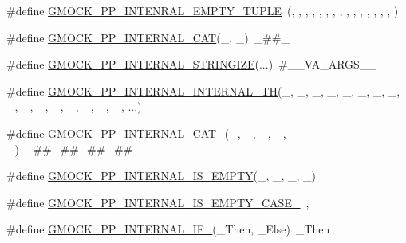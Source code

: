 \begin{DoxyCompactItemize}
\item 
\#define \mbox{\hyperlink{googletest-master_2googlemock_2include_2gmock_2internal_2gmock-pp_8h_a7a4a2a8606d20424b0ec1db4236819e4}{G\+M\+O\+C\+K\+\_\+\+P\+P\+\_\+\+I\+N\+T\+E\+N\+R\+A\+L\+\_\+\+E\+M\+P\+T\+Y\+\_\+\+T\+U\+P\+LE}}~(, , , , , , , , , , , , , , , )
\item 
\#define \mbox{\hyperlink{googletest-master_2googlemock_2include_2gmock_2internal_2gmock-pp_8h_a2b034c776c832e3d951f5d123658a7ba}{G\+M\+O\+C\+K\+\_\+\+P\+P\+\_\+\+I\+N\+T\+E\+R\+N\+A\+L\+\_\+\+C\+AT}}(\+\_,  \+\_)~\+\_\#\#\+\_
\item 
\#define \mbox{\hyperlink{googletest-master_2googlemock_2include_2gmock_2internal_2gmock-pp_8h_afd092b75707cbc1efd7fe183c94afb79}{G\+M\+O\+C\+K\+\_\+\+P\+P\+\_\+\+I\+N\+T\+E\+R\+N\+A\+L\+\_\+\+S\+T\+R\+I\+N\+G\+I\+ZE}}(...)~\#\+\_\+\+\_\+\+V\+A\+\_\+\+A\+R\+G\+S\+\_\+\+\_\+
\item 
\#define \mbox{\hyperlink{googletest-master_2googlemock_2include_2gmock_2internal_2gmock-pp_8h_ac3815de01d162a72578830f0ffbfbeb3}{G\+M\+O\+C\+K\+\_\+\+P\+P\+\_\+\+I\+N\+T\+E\+R\+N\+A\+L\+\_\+\+I\+N\+T\+E\+R\+N\+A\+L\+\_\+TH}}(\+\_,  \+\_,  \+\_,  \+\_,  \+\_,  \+\_,  \+\_,  \+\_,  \+\_,  \+\_,  \+\_,  \+\_,  \+\_,  \+\_,  \+\_,  \+\_,  ...)~\+\_
\item 
\#define \mbox{\hyperlink{googletest-master_2googlemock_2include_2gmock_2internal_2gmock-pp_8h_a11241887f4be09cdb6a57bb841620581}{G\+M\+O\+C\+K\+\_\+\+P\+P\+\_\+\+I\+N\+T\+E\+R\+N\+A\+L\+\_\+\+C\+A\+T\+\_}}(\+\_,  \+\_,  \+\_,  \+\_,  \+\_)~\+\_\#\#\+\_\#\#\+\_\#\#\+\_\#\#\+\_
\item 
\#define \mbox{\hyperlink{googletest-master_2googlemock_2include_2gmock_2internal_2gmock-pp_8h_a7ed13884d5ca70a35102f76d65677b13}{G\+M\+O\+C\+K\+\_\+\+P\+P\+\_\+\+I\+N\+T\+E\+R\+N\+A\+L\+\_\+\+I\+S\+\_\+\+E\+M\+P\+TY}}(\+\_,  \+\_,  \+\_,  \+\_)
\item 
\#define \mbox{\hyperlink{googletest-master_2googlemock_2include_2gmock_2internal_2gmock-pp_8h_ad02fd031aeb323ae431ebdfda4acdc99}{G\+M\+O\+C\+K\+\_\+\+P\+P\+\_\+\+I\+N\+T\+E\+R\+N\+A\+L\+\_\+\+I\+S\+\_\+\+E\+M\+P\+T\+Y\+\_\+\+C\+A\+S\+E\+\_}}~,
\item 
\#define \mbox{\hyperlink{googletest-master_2googlemock_2include_2gmock_2internal_2gmock-pp_8h_a9983cbccb2cbb6892e983b28ac9e2077}{G\+M\+O\+C\+K\+\_\+\+P\+P\+\_\+\+I\+N\+T\+E\+R\+N\+A\+L\+\_\+\+I\+F\+\_}}(\+\_\+\+Then,  \+\_\+\+Else)~\+\_\+\+Then

\end{DoxyCompactItemize}
